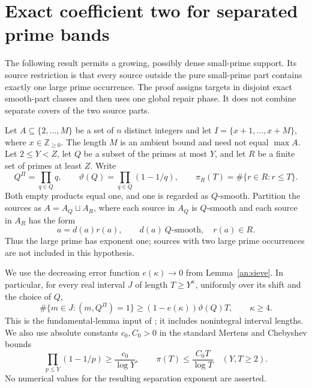 \section{Exact coefficient two for separated prime bands}
\label{sec:separated-bands}

The following result permits a growing, possibly dense small-prime support.
Its source restriction is that every source outside the pure small-prime
part contains exactly one large prime occurrence. The proof assigns targets
in disjoint exact smooth-part classes and then uses one global repair phase.
It does not combine separate covers of the two source parts.

Let $A\subseteq\{2,\ldots,M\}$ be a set of $n$ distinct integers and let
$I=\{x+1,\ldots,x+M\}$, where $x\in\mathbb Z_{\ge0}$. The length $M$
is an ambient bound and need not equal $\max A$. Let $2\le Y<Z$, let $Q$
be a subset of the primes at most $Y$, and let $R$ be a finite set of primes
at least $Z$. Write
\[
 Q^\Pi=\prod_{q\in Q}q,
 \qquad \vartheta(Q)=\prod_{q\in Q}(1-1/q),
 \qquad \pi_R(T)=\#\{r\in R:r\le T\}.
\]
Both empty products equal one, and one is regarded as $Q$-smooth. Partition
the sources as $A=A_Q\sqcup A_R$, where each source in $A_Q$ is $Q$-smooth
and each source in $A_R$ has the form
\begin{equation}
 a=d(a)r(a),\qquad d(a)\ \text{$Q$-smooth},\quad r(a)\in R.
 \label{eq:sep-source-form}
\end{equation}
Thus the large prime has exponent one; sources with two large prime
occurrences are not included in this hypothesis.

We use the decreasing error function $e(\kappa)\to0$ from
Lemma~\ref{an:sieve}. In particular, for every real interval $J$ of length
$T\ge Y^\kappa$, uniformly over its shift and the choice of $Q$,
\begin{equation}
 \#\{m\in J:(m,Q^\Pi)=1\}
 \ge (1-e(\kappa))\vartheta(Q)T,
 \qquad \kappa\ge4.
 \label{eq:sep-sieve}
\end{equation}
This is the fundamental-lemma input of \cite{Lagarias,GranvilleSound}; it
includes nonintegral interval lengths. We also use absolute constants
$c_0,C_0>0$ in the standard Mertens and Chebyshev bounds
\begin{equation}
 \prod_{p\le Y}(1-1/p)\ge\frac{c_0}{\log Y},
 \qquad \pi(T)\le\frac{C_0T}{\log T}
 \quad(Y,T\ge2).
 \label{eq:sep-prime-estimates}
\end{equation}
No numerical values for the resulting separation exponent are asserted.


